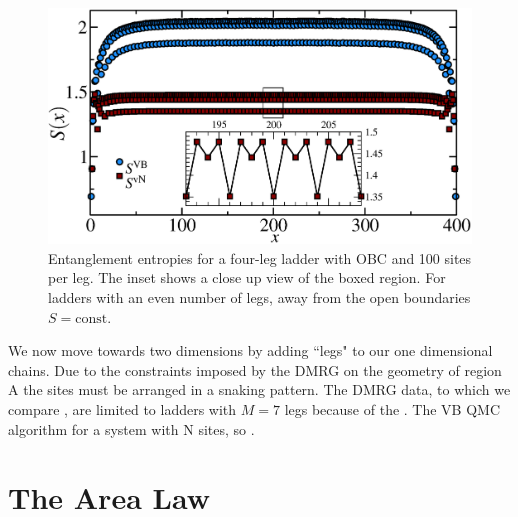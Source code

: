  \begin{figure} { \includegraphics[width=6in]{./figures/paper1/figure3/4-leg-ladder/4legfig.eps}
\caption[Entanglement entropies for a four-leg ladder]{
Entanglement entropies for a four-leg ladder with OBC and 100 sites per leg.  
The inset shows a close up view of the boxed region.  
For ladders with an even number of legs, away from the open boundaries $S = \text{const}$.
 \label{ladder4} }} 
 \end{figure}
 
 We now move towards two dimensions by adding ``legs" to our one dimensional chains.
 Due to the constraints imposed by the DMRG on the geometry of region A the sites must be arranged in a snaking pattern. 
The DMRG data, to which we compare \vb, are limited to ladders with $M=7$ legs because of the .
 The VB QMC algorithm  for a system with N sites, so .
\section{The Area Law}

